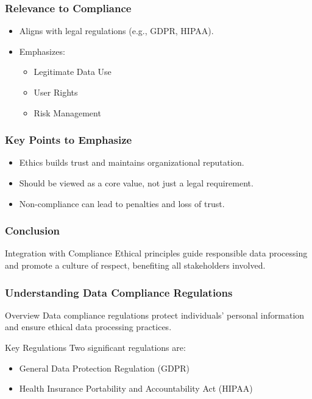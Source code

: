 \documentclass{beamer}
\begin{document}
\begin{frame}[fragile]
    \frametitle{Relevance to Compliance}
    \begin{itemize}
        \item Aligns with legal regulations (e.g., GDPR, HIPAA).
        \item Emphasizes:
            \begin{itemize}
                \item Legitimate Data Use
                \item User Rights
                \item Risk Management
            \end{itemize}
    \end{itemize}
\end{frame}

\begin{frame}[fragile]
    \frametitle{Key Points to Emphasize}
    \begin{itemize}
        \item Ethics builds trust and maintains organizational reputation.
        \item Should be viewed as a core value, not just a legal requirement.
        \item Non-compliance can lead to penalties and loss of trust.
    \end{itemize}
\end{frame}

\begin{frame}[fragile]
    \frametitle{Conclusion}
    \begin{block}{Integration with Compliance}
        Ethical principles guide responsible data processing and promote a culture of respect, benefiting all stakeholders involved.
    \end{block}
\end{frame}

\begin{frame}[fragile]
    \frametitle{Understanding Data Compliance Regulations}
    \begin{block}{Overview}
        Data compliance regulations protect individuals' personal information and ensure ethical data processing practices.
    \end{block}
    \begin{block}{Key Regulations}
        Two significant regulations are:
        \begin{itemize}
            \item General Data Protection Regulation (GDPR)
            \item Health Insurance Portability and Accountability Act (HIPAA)
        \end{itemize}
    \end{block}
\end{frame}
\end{document}
